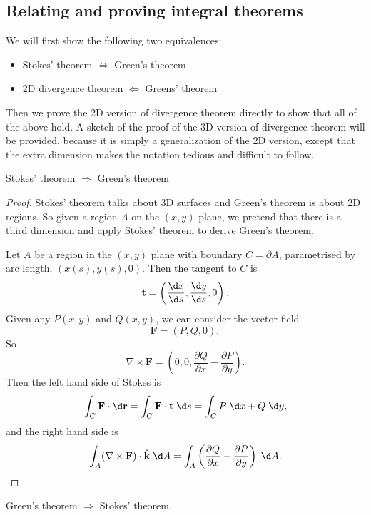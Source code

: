 \documentclass[a4paper]{article}
\begin{document}
\subsection{Relating and proving integral theorems}
We will first show the following two equivalences:
\begin{itemize}
  \item Stokes' theorem $\Leftrightarrow $ Green's theorem
  \item 2D divergence theorem $\Leftrightarrow$ Greens' theorem
\end{itemize}
Then we prove the 2D version of divergence theorem directly to show that all of the above hold. A sketch of the proof of the 3D version of divergence theorem will be provided, because it is simply a generalization of the 2D version, except that the extra dimension makes the notation tedious and difficult to follow.

\begin{prop}
  Stokes' theorem $\Rightarrow $ Green's theorem
\end{prop}

\begin{proof}
  Stokes' theorem talks about 3D surfaces and Green's theorem is about 2D regions. So given a region $A$ on the $(x, y)$ plane, we pretend that there is a third dimension and apply Stokes' theorem to derive Green's theorem.

  Let $A$ be a region in the $(x, y)$ plane with boundary $C = \partial A$, parametrised by arc length, $(x(s), y(s), 0)$. Then the tangent to $C$ is
  \[
    \mathbf{t} = \left(\frac{\d x}{\d s}, \frac{\d y}{\d s}, 0\right).
  \]
  Given any $P(x, y)$ and $Q(x, y)$, we can consider the vector field
  \[
    \mathbf{F} = (P, Q, 0),
  \]
  So
  \[
    \nabla \times \mathbf{F} = \left(0, 0, \frac{\partial Q}{\partial x} - \frac{\partial P}{\partial y}\right).
  \]
  Then the left hand side of Stokes is
  \[
    \int_C \mathbf{F} \cdot \d \mathbf{r} = \int_C \mathbf{F}\cdot \mathbf{t}\;\d s = \int_C P\;\d x + Q\;\d y,
  \]
  and the right hand side is
  \[
    \int_A (\nabla\times \mathbf{F})\cdot \hat{\mathbf{k}}\;\d A = \int_A \left(\frac{\partial Q}{\partial x} - \frac{\partial P}{\partial y}\right)\;\d A.\qedhere
  \]
\end{proof}

\begin{prop}
  Green's theorem $\Rightarrow $ Stokes' theorem.
\end{prop}
\end{document}
